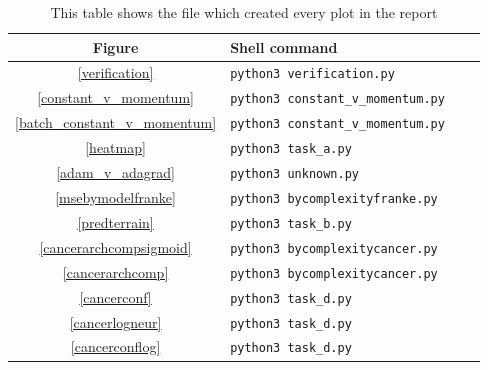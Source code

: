 \documentclass[onecolumn,10pt,cleanfoot]{asme2ej}
\begin{document}
\begin{table}
\caption{This table shows the file which created every plot in the report}
\begin{center}
\label{allparamstable}
\begin{tabular}{c | l l l}
Figure & Shell command \\
\hline
\ref{verification} & \texttt{python3 verification.py}\\
\ref{constant_v_momentum} & \texttt{python3 constant\_v\_momentum.py}\\
\ref{batch_constant_v_momentum} & \texttt{python3 constant\_v\_momentum.py}\\
\ref{heatmap} & \texttt{python3 task\_a.py}\\
\ref{adam_v_adagrad} & \texttt{python3 unknown.py}\\
\ref{msebymodelfranke} & \texttt{python3 bycomplexityfranke.py}\\
\ref{predterrain} & \texttt{python3 task\_b.py}\\
\ref{cancerarchcompsigmoid} & \texttt{python3 bycomplexitycancer.py}\\
\ref{cancerarchcomp} & \texttt{python3 bycomplexitycancer.py}\\
\ref{cancerconf} & \texttt{python3 task\_d.py}\\
\ref{cancerlogneur} & \texttt{python3 task\_d.py}\\
\ref{cancerconflog} & \texttt{python3 task\_d.py}\\
\hline
\end{tabular}
\end{center}
\end{table}
\end{document}
